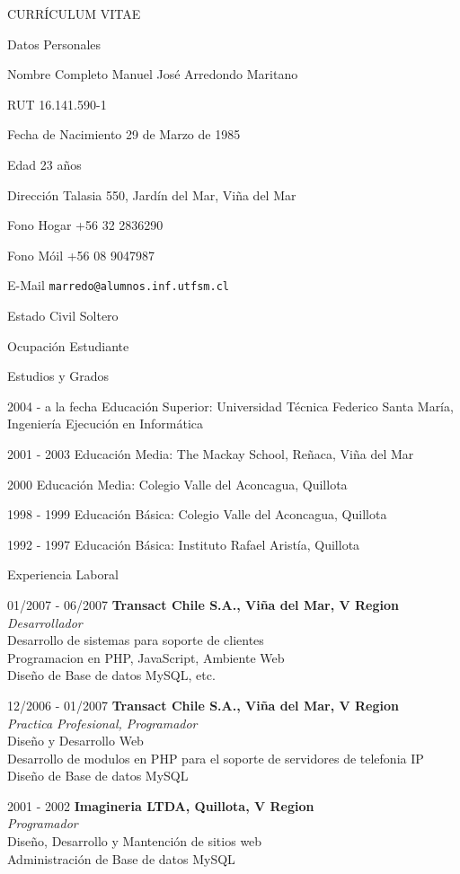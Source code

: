 \documentclass{article}
\begin{document}
\setlength{\cvlabelwidth}{45mm}
\begin{cv}{CURR\'ICULUM VITAE}

\begin{cvlist}{Datos Personales}
\item[Nombre Completo] Manuel Jos\'e Arredondo Maritano
\item[RUT] 16.141.590-1
\item[Fecha de Nacimiento] 29 de Marzo de 1985
\item[Edad] 23 a\~nos
\item[Direcci\'on] Talasia 550, Jard\'in del Mar, Vi\~na del Mar
\item[Fono Hogar] +56 32 2836290
\item[Fono M\'oil] +56 08 9047987
\item[E-Mail] \texttt{marredo@alumnos.inf.utfsm.cl}
\item[Estado Civil] Soltero
\item[Ocupaci\'on] Estudiante
\end{cvlist}

\begin{cvlist}{Estudios y Grados}
\item[2004 - a la fecha] Educaci\'on Superior: Universidad T\'ecnica Federico Santa Mar\'ia, Ingenier\'ia Ejecuci\'on en Inform\'atica
\item[2001 - 2003] Educaci\'on Media: The Mackay School, Re\~naca, Vi\~na del Mar
\item[2000       ] Educaci\'on Media: Colegio Valle del Aconcagua, Quillota
\item[1998 - 1999] Educaci\'on B\'asica: Colegio Valle del Aconcagua, Quillota
\item[1992 - 1997] Educaci\'on B\'asica: Instituto Rafael Arist\'ia, Quillota
\end{cvlist}

\begin{cvlist}{Experiencia Laboral}
\item[01/2007 - 06/2007] \textbf{Transact Chile S.A., Vi\~na del Mar, V Region}\\\textit{Desarrollador}\\Desarrollo de sistemas para soporte de clientes\\Programacion en PHP, JavaScript, Ambiente Web\\Dise\~no de Base de datos MySQL, etc.
\item[12/2006 - 01/2007] \textbf{Transact Chile S.A., Vi\~na del Mar, V Region}\\\textit{Practica Profesional, Programador}\\Dise\~no y Desarrollo Web\\Desarrollo de modulos en PHP para el soporte de servidores de telefonia IP\\Dise\~no de Base de datos MySQL
\item[2001 - 2002] \textbf{Imagineria LTDA, Quillota, V Region}\\\textit{Programador}\\Dise\~no, Desarrollo y Mantenci\'on de sitios web\\Administraci\'on de Base de datos MySQL
\end{cvlist}


\end{cv}
\end{document}
